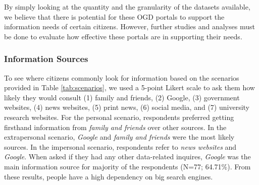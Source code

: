 \documentclass{sigchi}
\begin{document}
By simply looking at the quantity and the granularity of the datasets available, we believe that there is potential for these OGD portals to support the information needs of certain citizens. However, further studies and analyses must be done to evaluate how effective these portals are in supporting their needs. 

\subsubsection{Information Sources}
To see where citizens commonly look for information based on the scenarios provided in Table \ref{tab:scenarios}, we used a 5-point Likert scale to ask them how likely they would consult (1) family and friends, (2) Google, (3) government websites, (4) news websites, (5) print news, (6) social media, and (7) university research websites. For the personal scenario, respondents preferred getting firsthand information from \textit{family and friends} over other sources. In the extrapersonal scenario, \textit{Google} and \textit{family and friends} were the most likely sources. In the impersonal scenario, respondents refer to \textit{news websites} and \textit{Google}. When asked if they had any other data-related inquires, \textit{Google} was the main information source for majority of the respondents (N=77; 64.71\%). From these results, people have a high dependency on big search engines. 

\end{document}

